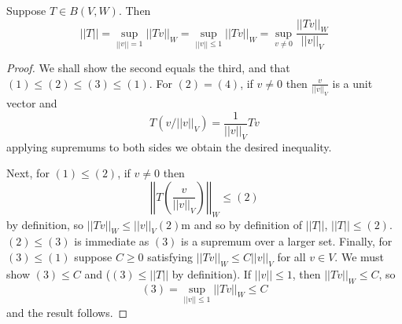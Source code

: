 \begin{prop}
    Suppose $T \in B(V,W)$. Then $$||T|| = \sup_{||v|| = 1}||Tv||_W = \sup_{||v||\leq 1}||Tv||_W = \sup_{v\neq 0}\frac{||Tv||_W}{||v||_V}$$
\end{prop}
\begin{proof}
    We shall show the second equals the third, and that $(1) \leq (2) \leq (3) \leq (1)$. For $(2) = (4)$, if $v \neq 0$ then $\frac{v}{||v||_V}$ is a unit vector and $$T(v/||v||_V) = \frac{1}{||v||_V}Tv$$ applying supremums to both sides we obtain the desired inequality. 

    Next, for $(1) \leq (2)$, if $v \neq 0$ then $$\left|\left|T\left(\frac{v}{||v||_V}\right)\right|\right|_W \leq (2)$$ by definition, so $||Tv||_W \leq ||v||_V(2)$m and so by definition of $||T||$, $||T|| \leq (2)$. $(2) \leq (3)$ is immediate as $(3)$ is a supremum over a larger set. Finally, for $(3) \leq (1)$ suppose $C \geq 0$ satisfying $||Tv||_W \leq C||v||_V$ for all $v \in V$. We must show $(3) \leq C$ and ($(3) \leq ||T||$ by definition). If $||v|| \leq 1$, then $||Tv||_W\leq C$, so $$(3) = \sup_{||v||\leq 1}||Tv||_W \leq C$$ and the result follows.
\end{proof}

